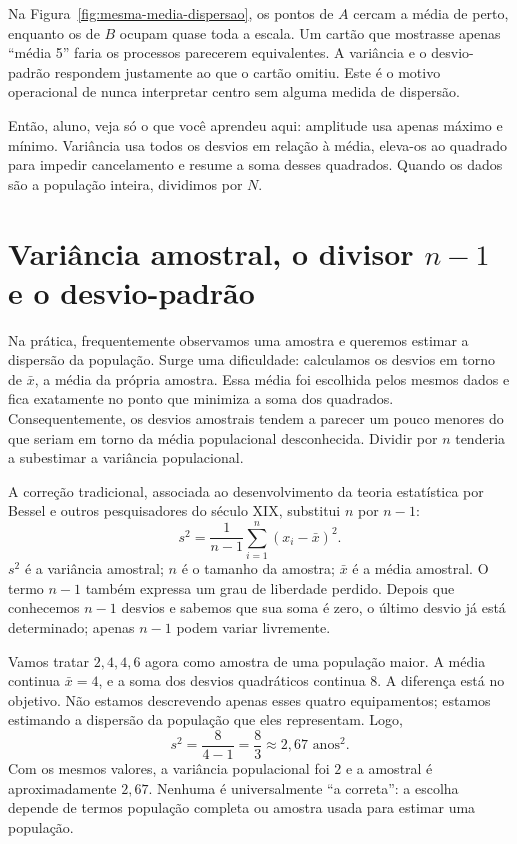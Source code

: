 Na Figura~\ref{fig:mesma-media-dispersao}, os pontos de $A$ cercam a média de perto, enquanto os de $B$ ocupam quase toda a escala. Um cartão que mostrasse apenas ``média 5'' faria os processos parecerem equivalentes. A variância e o desvio-padrão respondem justamente ao que o cartão omitiu. Este é o motivo operacional de nunca interpretar centro sem alguma medida de dispersão.

\begin{SummaryBox}
Então, aluno, veja só o que você aprendeu aqui: amplitude usa apenas máximo e mínimo. Variância usa todos os desvios em relação à média, eleva-os ao quadrado para impedir cancelamento e resume a soma desses quadrados. Quando os dados são a população inteira, dividimos por $N$.
\end{SummaryBox}

\section{Variância amostral, o divisor $n-1$ e o desvio-padrão}

Na prática, frequentemente observamos uma amostra e queremos estimar a dispersão da população. Surge uma dificuldade: calculamos os desvios em torno de $\bar{x}$, a média da própria amostra. Essa média foi escolhida pelos mesmos dados e fica exatamente no ponto que minimiza a soma dos quadrados. Consequentemente, os desvios amostrais tendem a parecer um pouco menores do que seriam em torno da média populacional desconhecida. Dividir por $n$ tenderia a subestimar a variância populacional.

A correção tradicional, associada ao desenvolvimento da teoria estatística por Bessel e outros pesquisadores do século XIX, substitui $n$ por $n-1$:
\[
s^2=\frac{1}{n-1}\sum_{i=1}^{n}(x_i-\bar{x})^2.
\]
$s^2$ é a variância amostral; $n$ é o tamanho da amostra; $\bar{x}$ é a média amostral. O termo $n-1$ também expressa um grau de liberdade perdido. Depois que conhecemos $n-1$ desvios e sabemos que sua soma é zero, o último desvio já está determinado; apenas $n-1$ podem variar livremente.

Vamos tratar ${2,4,4,6}$ agora como amostra de uma população maior. A média continua $\bar{x}=4$, e a soma dos desvios quadráticos continua $8$. A diferença está no objetivo. Não estamos descrevendo apenas esses quatro equipamentos; estamos estimando a dispersão da população que eles representam. Logo,
\[
s^2=\frac{8}{4-1}=\frac{8}{3}\approx2{,}67\text{ anos}^2.
\]
Com os mesmos valores, a variância populacional foi $2$ e a amostral é aproximadamente $2{,}67$. Nenhuma é universalmente ``a correta'': a escolha depende de termos população completa ou amostra usada para estimar uma população.

